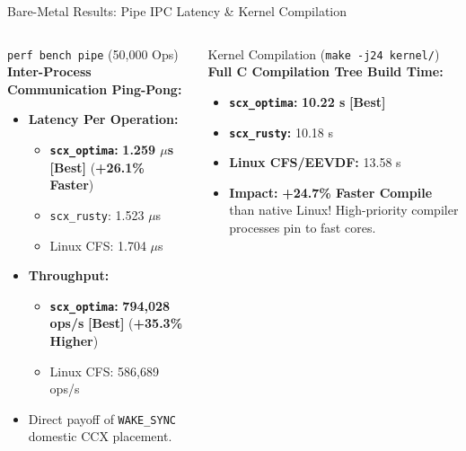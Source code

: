 \documentclass{beamer}
\begin{document}
\begin{frame}{Bare-Metal Results: Pipe IPC Latency \& Kernel Compilation}
  \begin{columns}[T]
      \begin{block}{\small \texttt{perf bench pipe} (50,000 Ops)}
        \footnotesize
        \textbf{Inter-Process Communication Ping-Pong:}
        \begin{itemize}\itemsep2pt\tiny
          \item \textbf{Latency Per Operation:}
                \begin{itemize}\tiny
                  \item \textbf{\texttt{scx\_optima}:} \textbf{1.259 $\mu$s} \textcolor{AccentOrange}{\textbf{[Best]}} (\textbf{+26.1\% Faster})
                  \item \texttt{scx\_rusty}: 1.523 $\mu$s
                  \item Linux CFS: 1.704 $\mu$s
                \end{itemize}
          \item \textbf{Throughput:}
                \begin{itemize}\tiny
                  \item \textbf{\texttt{scx\_optima}:} \textbf{794,028 ops/s} \textcolor{AccentOrange}{\textbf{[Best]}} (\textbf{+35.3\% Higher})
                  \item Linux CFS: 586,689 ops/s
                \end{itemize}
          \item Direct payoff of \texttt{WAKE\_SYNC} domestic CCX placement.
        \end{itemize}
      \end{block}

      \begin{exampleblock}{\small Kernel Compilation (\texttt{make -j24 kernel/})}
        \footnotesize
        \textbf{Full C Compilation Tree Build Time:}
        \begin{itemize}\itemsep2pt\tiny
          \item \textbf{\texttt{scx\_optima}:} \textbf{10.22 s} \textcolor{AccentOrange}{\textbf{[Best]}}
          \item \textbf{\texttt{scx\_rusty}:} 10.18 s
          \item \textbf{Linux CFS/EEVDF:} 13.58 s
          \item \textbf{Impact:} \textbf{+24.7\% Faster Compile} than native Linux! High-priority compiler processes pin to fast cores.
        \end{itemize}
      \end{exampleblock}
  \end{columns}
\end{frame}
\end{document}
